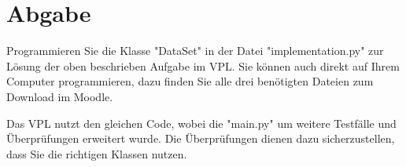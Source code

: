 \documentclass[10pt, a4paper]{article}
\begin{document}
\section{Abgabe} 
Programmieren Sie die Klasse "DataSet" in der Datei "implementation.py" zur Lösung der oben beschrieben Aufgabe im VPL.
Sie können auch direkt auf Ihrem Computer programmieren, dazu finden Sie alle drei benötigten Dateien zum Download im Moodle.

Das VPL nutzt den gleichen Code, wobei die "main.py" um weitere Testfälle und Überprüfungen erweitert wurde.
Die Überprüfungen dienen dazu sicherzustellen, dass Sie die richtigen Klassen nutzen.
%
\end{document}
